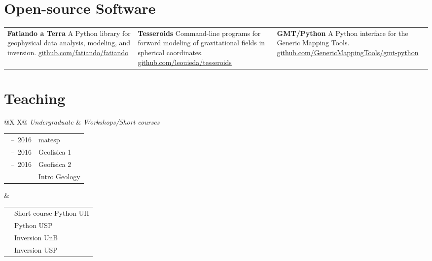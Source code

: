 \documentclass[11pt, a4paper]{article}
\newcommand{\TablePad}{\vspace{-0.4cm}}
\newcommand{\SoftwareTitle}[1]{{\fontsize{13pt}{0}\selectfont \bfseries #1}}
\newcommand{\TableTitle}[1]{{\fontsize{14pt}{0}\selectfont \itshape #1}}
\newcommand{\Duration}[2]{\fontsize{10pt}{0}\selectfont #1\ --\ #2}
\newcommand{\Year}[1]{\fontsize{10pt}{0}\selectfont #1}
\begin{document}
\section*{Open-source Software}

\TablePad
\begin{tabularx}{\textwidth}{@{}X X X@{}}
    \SoftwareTitle{Fatiando a Terra}
    \newline
    A Python library for geophysical data analysis, modeling, and
    inversion.
    \newline
    \href{https://github.com/fatiando/fatiando}{github.com/fatiando/fatiando}
    &
    \SoftwareTitle{Tesseroids}
    \newline
    Command-line programs for forward modeling of gravitational fields in
    spherical coordinates.
    \newline
    \href{https://github.com/leouieda/tesseroids}{github.com/leouieda/tesseroids}
    &
    \SoftwareTitle{GMT/Python}
    \newline
    A Python interface for the Generic Mapping Tools.
    \newline
    \href{https://github.com/GenericMappingTools/gmt-python}{github.com/GenericMappingTools/\newline gmt-python}
\end{tabularx}


\section*{Teaching}

\TablePad
\begin{tabularx}{\textwidth}{@{}X X@{}}
    \TableTitle{Undergraduate} & \TableTitle{Workshops/Short courses}
    \\[0.1cm]
    \begin{tabular}{@{}l l}
        \Duration{2014}{2016}  &
         matesp
        \hspace{10cm}
        \\
        \Duration{2014}{2016}  &
         Geofisica 1
        \\
        \Duration{2014}{2016}  &
         Geofisica 2
        \\
        \Year{2015}  &
         Intro Geology
    \end{tabular}
    &
    \begin{tabular}{@{}l l}
        \Year{2017}  &
        Short course Python UH
        \\
        \Year{2016}  &
        Python USP
        \\
        \Year{2014}  &
        Inversion UnB
        \\
        \Year{2011}  &
        Inversion USP
    \end{tabular}
\end{tabularx}
\end{document}
